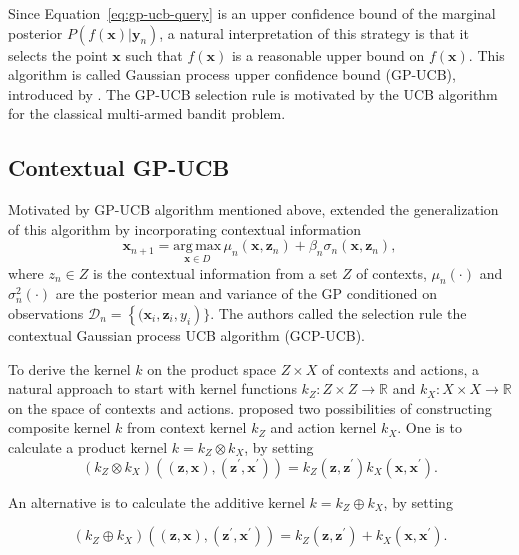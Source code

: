 \documentclass{article}
\begin{document}
Since Equation~\ref{eq:gp-ucb-query} is an upper confidence bound of
the marginal posterior $P(f(\mathbf{x})|\mathbf{y}_n)$, a natural
interpretation of this strategy is that it selects the point
$\mathbf{x}$ such that $f(\mathbf{x})$ is a reasonable upper bound on
$f(\mathbf{x})$. This algorithm is called Gaussian process upper
confidence bound (GP-UCB), introduced by \cite{Srinivas2010-hi}. The
GP-UCB selection rule is motivated by the UCB algorithm for the
classical multi-armed bandit problem.

\subsection{Contextual GP-UCB}
Motivated by GP-UCB algorithm mentioned above, \cite{Krause2011-sb}
extended the generalization of this algorithm by incorporating
contextual information
\begin{equation}
  \mathbf{x}_{n+1} = \underset{\mathbf{x} \in D}{\mathrm{arg \,
      max}}\,\mu_n(\mathbf{x}, \mathbf{z}_n)+\beta_n
  \sigma_n(\mathbf{x}, \mathbf{z}_n),
\end{equation} \label{eq:cgp-ucb-query}
where $z_n \in Z$ is the contextual information from a set $Z$ of
contexts, $\mu_n(\cdot)$ and $\sigma_n^2(\cdot)$ are the posterior mean
and variance of the GP conditioned on observations $\mathcal{D}_n =
\left \{( \mathbf{x}_i, \mathbf{z}_i, y_i \right )\}.$ The authors
called the selection rule the contextual Gaussian process UCB
algorithm (GCP-UCB).

To derive the kernel $k$ on the product space $Z\times X$ of contexts and
actions, a natural approach to start with kernel functions $k_Z:
Z\times Z \rightarrow \mathbb{R}$ and $k_X:X \times X \rightarrow
\mathbb{R}$ on the space of contexts and actions. \cite{Krause2011-sb}
proposed two possibilities of constructing composite kernel $k$ from
context kernel $k_Z$ and action kernel $k_X$. One is to calculate a
product kernel $k=k_Z\otimes k_X$, by setting
\begin{equation}
  (k_Z\otimes k_X)((\mathbf{z}, \mathbf{x}),(\mathbf{z}^{\prime},
  \mathbf{x}^{\prime})) = k_Z(\mathbf{z}, \mathbf{z}^{\prime})k_X(\mathbf{x}, \mathbf{x}^{\prime}).
\end{equation}

An alternative is to calculate the additive kernel $k=k_Z\oplus k_X$,
by setting

\begin{equation}
  (k_Z\oplus k_X)((\mathbf{z}, \mathbf{x}),(\mathbf{z}^{\prime},
  \mathbf{x}^{\prime})) = k_Z(\mathbf{z}, \mathbf{z}^{\prime})+k_X(\mathbf{x}, \mathbf{x}^{\prime}).
\end{equation}
\end{document}
